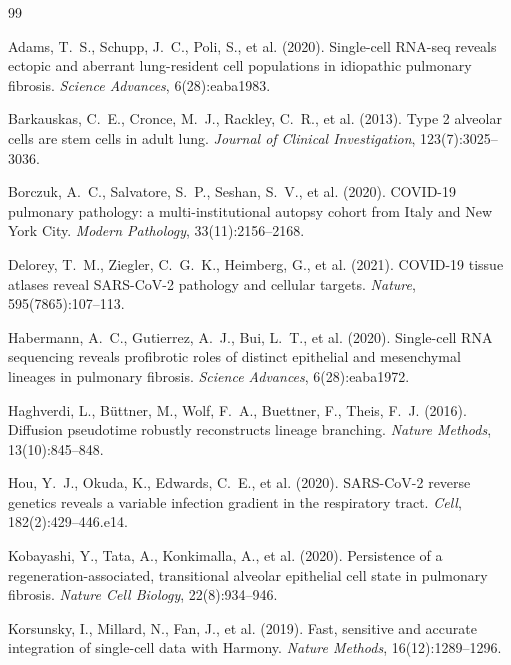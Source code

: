 \documentclass[11pt]{article}
\begin{document}
\begin{thebibliography}{99}
\small

Adams, T.~S., Schupp, J.~C., Poli, S., et al. (2020).
Single-cell RNA-seq reveals ectopic and aberrant lung-resident cell populations in idiopathic pulmonary fibrosis.
\textit{Science Advances}, 6(28):eaba1983.

Barkauskas, C.~E., Cronce, M.~J., Rackley, C.~R., et al. (2013).
Type 2 alveolar cells are stem cells in adult lung.
\textit{Journal of Clinical Investigation}, 123(7):3025--3036.

Borczuk, A.~C., Salvatore, S.~P., Seshan, S.~V., et al. (2020).
COVID-19 pulmonary pathology: a multi-institutional autopsy cohort from Italy and New York City.
\textit{Modern Pathology}, 33(11):2156--2168.

Delorey, T.~M., Ziegler, C.~G.~K., Heimberg, G., et al. (2021).
COVID-19 tissue atlases reveal SARS-CoV-2 pathology and cellular targets.
\textit{Nature}, 595(7865):107--113.

Habermann, A.~C., Gutierrez, A.~J., Bui, L.~T., et al. (2020).
Single-cell RNA sequencing reveals profibrotic roles of distinct epithelial and mesenchymal lineages in pulmonary fibrosis.
\textit{Science Advances}, 6(28):eaba1972.

Haghverdi, L., B\"{u}ttner, M., Wolf, F.~A., Buettner, F., Theis, F.~J. (2016).
Diffusion pseudotime robustly reconstructs lineage branching.
\textit{Nature Methods}, 13(10):845--848.

Hou, Y.~J., Okuda, K., Edwards, C.~E., et al. (2020).
SARS-CoV-2 reverse genetics reveals a variable infection gradient in the respiratory tract.
\textit{Cell}, 182(2):429--446.e14.

Kobayashi, Y., Tata, A., Konkimalla, A., et al. (2020).
Persistence of a regeneration-associated, transitional alveolar epithelial cell state in pulmonary fibrosis.
\textit{Nature Cell Biology}, 22(8):934--946.

Korsunsky, I., Millard, N., Fan, J., et al. (2019).
Fast, sensitive and accurate integration of single-cell data with Harmony.
\textit{Nature Methods}, 16(12):1289--1296.


\end{thebibliography}
\end{document}
